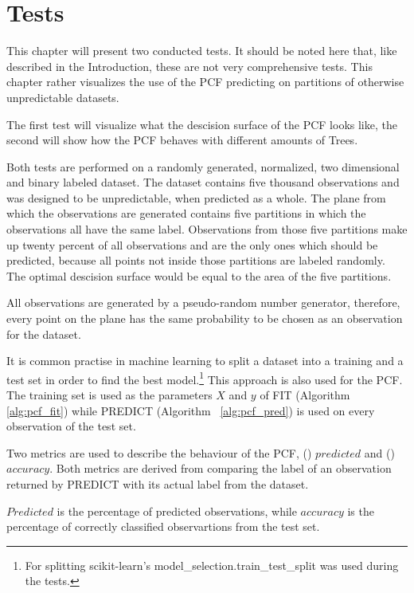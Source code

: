 \section{Tests}
\label{sec:tests}

This chapter will present two conducted tests. It should
be noted here that, like described in the Introduction,
these are not very comprehensive tests. This chapter rather
visualizes the use of the PCF predicting on partitions of
otherwise unpredictable datasets.

The first test will visualize what the descision surface of
the PCF looks like, the second will show how the PCF
behaves with different amounts of Trees.

Both tests are performed on a randomly generated,
normalized, two dimensional and binary labeled dataset. The
dataset contains five thousand observations and was
designed to be unpredictable, when predicted as a whole.
The plane from which the observations are generated
contains five partitions in which the observations all have
the same label. Observations from those five partitions
make up twenty percent of all observations and are the only
ones which should be predicted, because all points not
inside those partitions are labeled randomly. The optimal
descision surface would be equal to the area of the five
partitions.

All observations are generated by a pseudo-random number
generator\cite[chapter 9.6]{python}, therefore, every point
on the plane has the same probability to be chosen as an
observation for the dataset.

It is common practise in machine learning to split a
dataset into a training and a test set in order to find
the best model.\footnote{For splitting scikit-learn's
  model\_selection.train\_test\_split was used during the
  tests.\cite{sklearn_api}}\cite[chapter 18]{ki}
This approach is also used for the PCF. The training set is
used as the parameters $X$ and $y$ of FIT (Algorithm~%
\ref{alg:pcf_fit}) while PREDICT (Algorithm~%
\ref{alg:pcf_pred}) is used on every observation of the
test set.

Two metrics are used to describe the behaviour of the PCF,
() $predicted$ and ()
$accuracy$. Both metrics are derived from comparing the
label of an observation returned by PREDICT with its actual
label from the dataset.

$Predicted$ is the percentage of predicted observations,
while $accuracy$ is the percentage of correctly classified
observartions from the test set.

